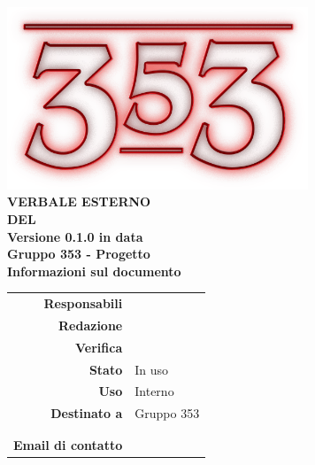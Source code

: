 \documentclass[openany, a4paper, 12pt]{report}
\begin{document}
\begin{titlepage}
	\centering
	\vfill
	{
		\bfseries
		\vskip2cm
		\includegraphics[width=9cm]{../../common/images/logo.png} \\
		\vfill
		\Huge{VERBALE ESTERNO\\DEL {}}\\
		\vfill
		\Large Versione 0.1.0 in data \\
		\large Gruppo 353 - Progetto \progetto \\
		\vfill
		\normalsize Informazioni sul documento\\
		\begin{table}[htbp]
			\centering
			\renewcommand\arraystretch{1.2}
			\begin{tabular}{r|l}
				\hline
				\textbf{Responsabili}	& \Parwinder\\
				
				\textbf{Redazione} 		& \Valentina \\
				\textbf{Verifica} 		& \Elena \\	
				
				\textbf{Stato} 			& In uso\\
				\textbf{Uso}			& Interno\\
				\textbf{Destinato a}   	& Gruppo 353\\
										& \Vardanega\\
										& \Cardin\\
				
				\textbf{Email di contatto}	& \mailleaf
			\end{tabular}
		\end{table}
		\vfill 
	}    
\end{titlepage}

\tableofcontents
\newpage
{}

 
\end{document}
